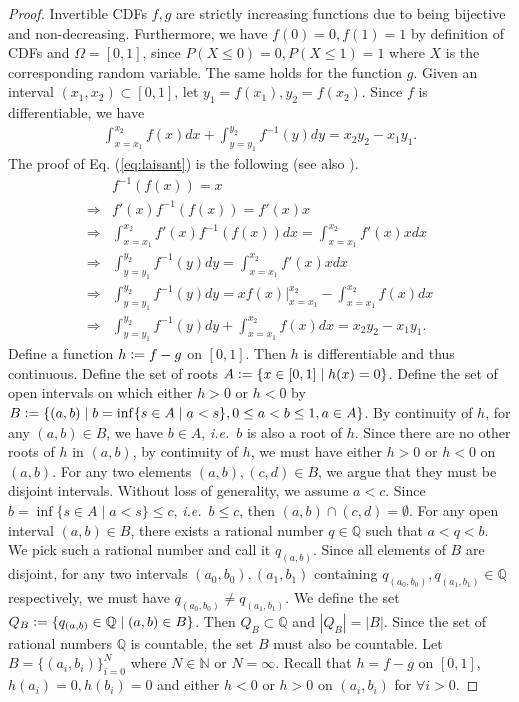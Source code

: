 \documentclass[letterpaper]{article}
\newcommand{\ie}{\emph{i.e.}}
\renewcommand{\eqref}[1]{Eq. (\ref{#1})}
\theoremstyle{definition}
\begin{document}
\begin{proof}
 Invertible CDFs $f,g$ are strictly increasing functions due to being bijective and non-decreasing. Furthermore, we have $f(0)=0, f(1)=1$ by definition of CDFs and $\Omega=[0,1]$, since $P(X\leq 0) = 0, P(X\leq 1) = 1$ where $X$ is the corresponding random variable. The same holds for the function $g$. Given an interval $(x_1, x_2)\subset[0,1]$, let $y_1 = f(x_1), y_2 = f(x_2)$. Since $f$ is differentiable, we have
 \begin{align}
     \int_{x=x_1}^{x_2} f(x)dx + \int_{y=y_1}^{y_2} f^{-1}(y)dy = x_2 y_2- x_1 y_1.
     \label{eq:laisant}
 \end{align} 
 The proof of \eqref{eq:laisant} is the following (see also \cite{laisant05integration}). \begin{align*}
     &f^{-1}(f(x)) = x\\
     \Longrightarrow &f'(x) f^{-1}(f(x)) = f'(x)x \tag*{(multiply both sides by $f'(x)$)}\\
     \Longrightarrow &\int_{x=x_1}^{x_2} f'(x) f^{-1}(f(x)) dx= \int_{x=x_1}^{x_2} f'(x)x dx \tag*{(integrate both sides)}\\
     \Longrightarrow &\int_{y=y_1}^{y_2} f^{-1}(y)dy = \int_{x=x_1}^{x_2} f'(x)x dx \tag*{(apply change of variable $y=f(x)$ on the left side)}\\
     \Longrightarrow &\int_{y=y_1}^{y_2} f^{-1}(y)dy = xf(x){\bigg|}_{x=x_1}^{x_2} - \int_{x=x_1}^{x_2} f(x) dx \tag*{(integrate by parts on the right side)}\\
     \Longrightarrow &\int_{y=y_1}^{y_2} f^{-1}(y)dy +\int_{x=x_1}^{x_2} f(x)dx = x_2 y_2- x_1 y_1.
 \end{align*} 
Define a function $h \vcentcolon= f-g$ on $[0,1]$. Then $h$ is differentiable and thus continuous. Define the set of roots $A \vcentcolon= \{x \in [0,1] \mid h(x) = 0\}$. Define the set of open intervals on which either $h>0$ or $h<0$ by $B \vcentcolon= \{(a,b) \mid b = \inf\{s\in A\mid a<s\}, 0\leq a<b\leq 1, a\in A\}$. By continuity of $h$, for any $(a,b)\in B$, we have $b\in A$, \ie~$b$ is also a root of $h$. Since there are no other roots of $h$ in $(a,b)$, by continuity of $h$, we must have either $h>0$ or $h<0$ on $(a,b)$. For any two elements $(a,b), (c,d)\in B$, we argue that they must be disjoint intervals. Without loss of generality, we assume $a<c$. Since $b=\inf\{s\in A\mid a<s\}\leq c$, \ie~$b\leq c$, then $(a,b)\cap(c,d)=\emptyset$. For any open interval $(a,b)\in B$, there exists a rational number $q\in\mathbb{Q}$ such that $a<q<b$. We pick such a rational number and call it $q_{(a,b)}$. Since all elements of $B$ are disjoint, for any two intervals $(a_0, b_0), (a_1, b_1)$ containing $q_{(a_0, b_0)}, q_{(a_1, b_1)}\in\mathbb{Q}$ respectively, we must have $q_{(a_0, b_0)}\neq q_{(a_1, b_1)}$. We define the set $Q_B \vcentcolon= \{q_{(a,b)}\in\mathbb{Q} \mid (a,b)\in B\}$. Then $Q_B\subset \mathbb{Q}$ and $|Q_B| = |B|$. Since the set of rational numbers $\mathbb{Q}$ is countable, the set $B$ must also be countable. Let $B=\{(a_i, b_i)\}_{i=0}^N$ where $N\in\mathbb{N}$ or $N=\infty$. Recall that $h = f-g$ on $[0,1]$, $h(a_i)=0, h(b_i)=0$ and either $h<0$ or $h>0$ on $(a_i, b_i)$ for $\forall i>0$.


\end{proof}
\end{document}
